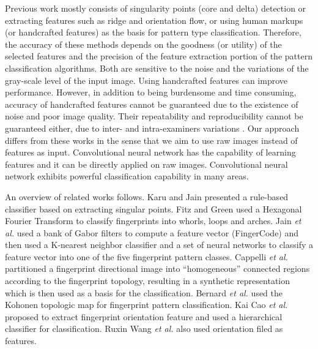 

Previous work mostly consists of singularity points (core and delta) detection or extracting features such as ridge and orientation flow, or using human markups (or handcrafted features) as the basis for pattern type classification. 
%
Therefore, the accuracy of these methods depends on the goodness (or utility) of the selected features and the precision of the feature extraction portion of the pattern classification algorithms. Both are sensitive to the noise and the variations of the gray-scale level of the input image.  
%
Using handcrafted features can improve performance.  However, in addition to being burdensome and time consuming, accuracy of handcrafted features cannot be guaranteed due to the existence of noise and poor image quality. 
%
Their repeatability and reproducibility cannot be guaranteed either, due to inter- and intra-examiners variations \cite{fbiBlackbox}.  
%
Our approach differs from these works in the sense that we aim to use raw images instead of features as input. Convolutional neural network has the capability of learning features and it can be directly applied on raw images. Convolutional neural network exhibits powerful classification capability in many areas\cite{lecun2015deep}\cite{szegedy2016rethinking}.

%
An overview of related works follows. 
%
Karu and Jain \cite{karuJain1996} presented a rule-based classifier based on extracting singular points. 
%
Fitz and Green \cite{FitzGreen1996} used a Hexagonal Fourier Transform to classify fingerprints into whorls, loops and arches. 
%
Jain \textit{et al.} \cite{JainSalil1999} used a bank of Gabor filters to compute a feature vector (FingerCode) and then used a K-nearest neighbor classifier and a set of neural networks to classify a feature vector into one of the five fingerprint pattern classes.
%
Cappelli \textit{et al.} \cite{cappelli1999} partitioned a fingerprint directional image into ``homogeneous'' connected regions according to the fingerprint topology, resulting in a synthetic representation which is then used as a basis for the classification.
%
Bernard \textit{et al.} \cite{Bernard2001} used the Kohonen topologic map for fingerprint pattern classification. 
%
Kai Cao \textit{et al.}\cite{cao2013fingerprint} proposed to extract fingerprint orientation feature and used a hierarchical classifier for classification.
%
Ruxin Wang \textit{et al.} \cite{wang2014fingerprint} also used orientation filed as features. %
 
